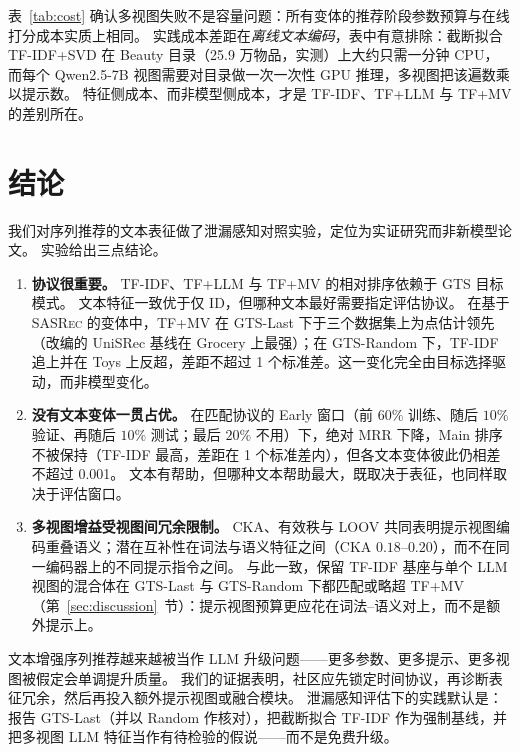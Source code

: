 \documentclass[sigconf,natbib=true,anonymous]{acmart}
\newcommand{\tfidf}{\textsc{TF-IDF}\xspace}
\newcommand{\tfllm}{\textsc{TF+LLM}\xspace}
\newcommand{\tfmv}{\textsc{TF+MV}\xspace}
\newcommand{\base}{\textsc{SASRec}\xspace}
\begin{document}
表~\ref{tab:cost} 确认多视图失败不是容量问题：所有变体的推荐阶段参数预算与在线打分成本实质上相同。
实践成本差距在\emph{离线文本编码}，表中有意排除：截断拟合 \tfidf+SVD 在 Beauty 目录（25.9 万物品，实测）上大约只需一分钟 CPU，而每个 Qwen2.5-7B 视图需要对目录做一次一次性 GPU 推理，多视图把该遍数乘以提示数。
特征侧成本、而非模型侧成本，才是 \tfidf、\tfllm 与 \tfmv 的差别所在。

\section{结论}
\label{sec:conclusion}

我们对序列推荐的文本表征做了泄漏感知对照实验，定位为实证研究而非新模型论文。
实验给出三点结论。

\begin{enumerate}[leftmargin=*,itemsep=1pt]
\item \textbf{协议很重要。}
\tfidf、\tfllm 与 \tfmv 的相对排序依赖于 GTS 目标模式。
文本特征一致优于仅 ID，但哪种文本最好需要指定评估协议。
在基于 \base 的变体中，\tfmv 在 GTS-Last 下于三个数据集上为点估计领先（改编的 UniSRec 基线在 Grocery 上最强）；在 GTS-Random 下，\tfidf 追上并在 Toys 上反超，差距不超过 1 个标准差。这一变化完全由目标选择驱动，而非模型变化。
\item \textbf{没有文本变体一贯占优。}
在匹配协议的 Early 窗口（前 $60\%$ 训练、随后 $10\%$ 验证、再随后 $10\%$ 测试；最后 $20\%$ 不用）下，绝对 MRR 下降，Main 排序不被保持（\tfidf 最高，差距在 1 个标准差内），但各文本变体彼此仍相差不超过 0.001。
文本有帮助，但哪种文本帮助最大，既取决于表征，也同样取决于评估窗口。
\item \textbf{多视图增益受视图间冗余限制。}
CKA、有效秩与 LOOV 共同表明提示视图编码重叠语义；潜在互补性在词法与语义特征之间（CKA $0.18$--$0.20$），而不在同一编码器上的不同提示指令之间。
与此一致，保留 \tfidf 基座与单个 LLM 视图的混合体在 GTS-Last 与 GTS-Random 下都匹配或略超 \tfmv（第~\ref{sec:discussion}~节）：提示视图预算更应花在词法--语义对上，而不是额外提示上。
\end{enumerate}

文本增强序列推荐越来越被当作 LLM 升级问题——更多参数、更多提示、更多视图被假定会单调提升质量。
我们的证据表明，社区应先锁定时间协议，再诊断表征冗余，然后再投入额外提示视图或融合模块。
泄漏感知评估下的实践默认是：报告 GTS-Last（并以 Random 作核对），把截断拟合 \tfidf 作为强制基线，并把多视图 LLM 特征当作有待检验的假说——而不是免费升级。
\end{document}
